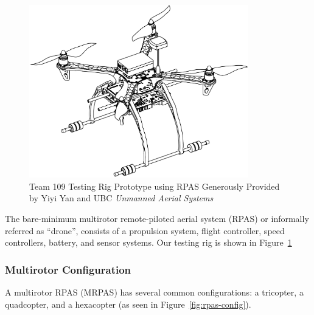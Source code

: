 \begin{figure}[H]
    \centering
    \includegraphics[width=0.85\textwidth]{img/testrigcad1.png}
    \caption{Team 109 Testing Rig Prototype using RPAS Generously Provided by Yiyi Yan and UBC \textit{Unmanned Aerial Systems}}
    \label{fig:testrigcad1}
\end{figure}

The bare-minimum multirotor remote-piloted aerial system (RPAS) or informally referred as ``drone'', consists of a propulsion system, flight controller, speed controllers, battery, and sensor systems. Our testing rig is shown  in Figure~\ref{fig:testrigcad1}

\subsubsection{Multirotor Configuration}

A multirotor RPAS (MRPAS) has several common configurations: a tricopter, a quadcopter, and a hexacopter (as seen in Figure~\ref{fig:rpas-config}).

